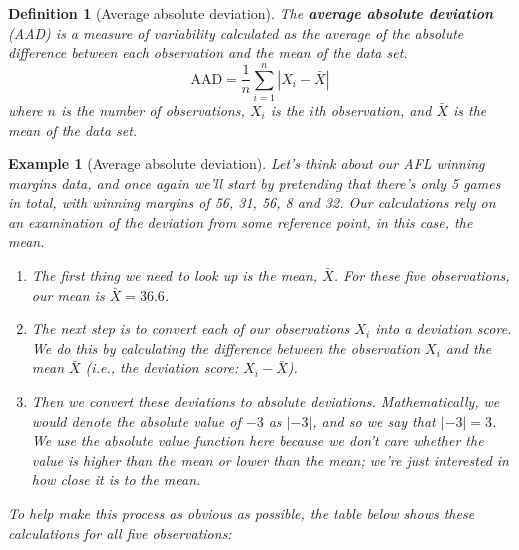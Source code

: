 \documentclass[
  11pt,
]{book}
\providecommand{\tightlist}{%
  \setlength{\itemsep}{0pt}\setlength{\parskip}{0pt}}
\theoremstyle{indenteddefinition}
\newtheorem{definition}{Definition}[chapter]
\theoremstyle{indenteddefinition}
\newtheorem{example}{Example}[chapter]
\theoremstyle{definition}
\theoremstyle{definition}
\theoremstyle{remark}
\begin{document}
\begin{definition}[Average absolute deviation]
\protect\hypertarget{def:defAAD}{}\label{def:defAAD}The \textbf{average absolute deviation} (AAD) is a measure of variability calculated as the average of the absolute difference between each observation and the \emph{mean} of the data set.
\[
\text{AAD} = \frac{1}{n} \sum_{i=1}^n |X_i - \bar{X}|
\]
where \(n\) is the number of observations, \(X_i\) is the \(i\)th observation, and \(\bar{X}\) is the mean of the data set.
\end{definition}

\begin{example}[Average absolute deviation]
\protect\hypertarget{exm:exAAD}{}\label{exm:exAAD}Let's think about our AFL winning margins data, and once again we'll start by pretending that there's only 5 games in total, with winning margins of 56, 31, 56, 8 and 32. Our calculations rely on an examination of the deviation from some reference point, in this case, the mean.

\begin{enumerate}
\def\labelenumi{\arabic{enumi}.}
\tightlist
\item
  The first thing we need to look up is the mean, \(\bar{X}\). For these five observations, our mean is \(\bar{X} = 36.6\).
\item
  The next step is to convert each of our observations \(X_i\) into a deviation score. We do this by calculating the difference between the observation \(X_i\) and the mean \(\bar{X}\) (i.e., the deviation score: \(X_i - \bar{X}\)).
\item
  Then we convert these deviations to absolute deviations. Mathematically, we would denote the absolute value of \(-3\) as \(|-3|\), and so we say that \(|-3| = 3\). We use the absolute value function here because we don't care whether the value is higher than the mean or lower than the mean; we're just interested in how \emph{close} it is to the mean.
\end{enumerate}

To help make this process as obvious as possible, the table below shows these calculations for all five observations:

\begin{table}[H]
\centering
{}
\end{table}


\end{example}
\end{document}
